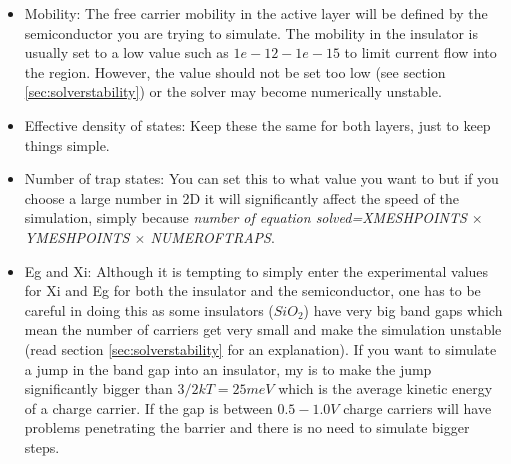\begin{itemize}
  \item Mobility: The free carrier mobility in the active layer will be defined by the semiconductor you are trying to simulate.  The mobility in the insulator is usually set to a low value such as $1e-12-1e-15$ to limit current flow into the region. However, the value should not be set too low (see section \ref{sec:solverstability}) or the solver may become numerically unstable.
  \item Effective density of states: Keep these the same for both layers, just to keep things simple.
  \item Number of trap states: You can set this to what value you want to but if you choose a large number in 2D it will significantly affect the speed of the simulation, simply because \emph{number of equation solved=XMESHPOINTS $\times$ YMESHPOINTS $\times$ NUMEROFTRAPS}.
  \item Eg and Xi: Although it is tempting to simply enter the experimental values for Xi and Eg for both the insulator and the semiconductor, one has to be careful in doing this as some insulators ($SiO_2$) have very big band gaps which mean the number of carriers get very small and make the simulation unstable (read section \ref{sec:solverstability} for an explanation).  If you want to simulate a jump in the band gap into an insulator, my is to make the jump significantly bigger than $3/2kT=25meV$ which is the average kinetic energy of a charge carrier.  If the gap is between $0.5-1.0 V$ charge carriers will have problems penetrating the barrier and there is no need to simulate bigger steps.
\end{itemize}

